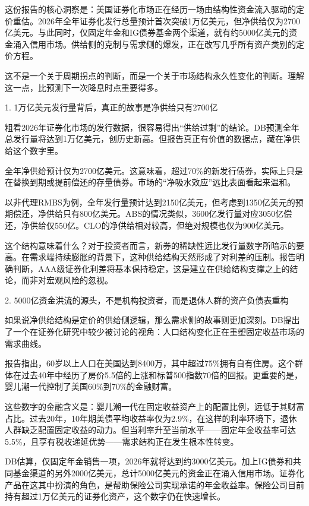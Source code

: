 \documentclass[11pt]{ctexart}
\begin{document}
这份报告的核心洞察是：美国证券化市场正在经历一场由结构性资金流入驱动的定价重估。2026年全年证券化发行总量预计首次突破1万亿美元，但净供给仅为2700亿美元。与此同时，仅固定年金和IG债券基金两个渠道，就有约5000亿美元的资金涌入信用市场。供给侧的克制与需求侧的爆发，正在改写几乎所有资产类别的定价方程。

这不是一个关于周期拐点的判断，而是一个关于市场结构永久性变化的判断。理解这一点，比预测下一次降息时点重要得多。

1. 1万亿美元发行量背后，真正的故事是净供给只有2700亿

粗看2026年证券化市场的发行数据，很容易得出“供给过剩”的结论。DB预测全年总发行量将达到1万亿美元，创历史新高。但报告真正有价值的数据点，藏在净供给这个数字里。

全年净供给预计仅为2700亿美元。这意味着，超过70\%的新发行债券，实际上只是在替换到期或提前偿还的存量债券。市场的“净吸水效应”远比表面看起来温和。

以非代理RMBS为例，全年发行量预计达到2150亿美元，但考虑到1350亿美元的预期偿还，净供给只有800亿美元。ABS的情况类似，3600亿发行量对应3050亿偿还，净供给仅550亿。CLO的净供给相对较高，但绝对规模也仅为900亿美元。

这个结构意味着什么？对于投资者而言，新券的稀缺性远比发行量数字所暗示的要高。在需求端持续膨胀的背景下，这种供给结构天然形成了对利差的压制。报告明确判断，AAA级证券化利差将基本保持稳定，这是建立在供给结构支撑之上的结论，而非对宏观风险的忽视。

2. 5000亿资金洪流的源头，不是机构投资者，而是退休人群的资产负债表重构

如果说净供给结构是定价的供给侧逻辑，那么需求侧的故事则更加深刻。DB提出了一个在证券化研究中较少被讨论的视角：人口结构变化正在重塑固定收益市场的需求曲线。

报告指出，60岁以上人口在美国达到8400万，其中超过75\%拥有自有住房。这个群体在过去40年中经历了房价5.5倍的上涨和标普500指数70倍的回报。更重要的是，婴儿潮一代控制了美国60\%到70\%的金融财富。

这些数字的金融含义是：婴儿潮一代在固定收益资产上的配置比例，远低于其财富占比。过去20年，10年期美债平均收益率仅为2.9\%，在这样的利率环境下，退休人群缺乏配置固定收益的动力。但当利率升至当前水平——固定年金收益率可达5.5\%，且享有税收递延优势——需求结构正在发生根本性转变。

DB估算，仅固定年金销售一项，2026年就将达到约3000亿美元。加上IG债券和共同基金渠道的另外2000亿美元，总计5000亿美元的资金正在涌入信用市场。证券化产品在这其中扮演的角色，是帮助保险公司实现承诺的年金收益率。保险公司目前持有超过1万亿美元的证券化资产，这个数字仍在快速增长。
\end{document}
